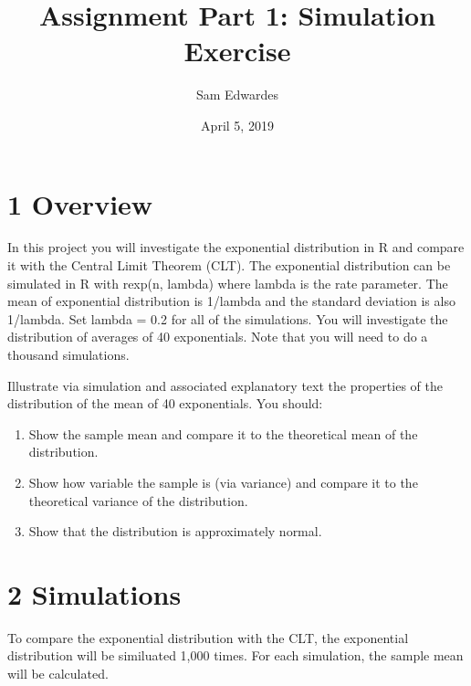 \documentclass[]{article}
\title{Assignment Part 1: Simulation Exercise}
\author{Sam Edwardes}
\date{April 5, 2019}
\providecommand{\tightlist}{%
  \setlength{\itemsep}{0pt}\setlength{\parskip}{0pt}}
\begin{document}
\maketitle

\hypertarget{overview}{%
\section{1 Overview}\label{overview}}

In this project you will investigate the exponential distribution in R
and compare it with the Central Limit Theorem (CLT). The exponential
distribution can be simulated in R with rexp(n, lambda) where lambda is
the rate parameter. The mean of exponential distribution is 1/lambda and
the standard deviation is also 1/lambda. Set lambda = 0.2 for all of the
simulations. You will investigate the distribution of averages of 40
exponentials. Note that you will need to do a thousand simulations.

Illustrate via simulation and associated explanatory text the properties
of the distribution of the mean of 40 exponentials. You should:

\begin{enumerate}
\def\labelenumi{\arabic{enumi}.}
\tightlist
\item
  Show the sample mean and compare it to the theoretical mean of the
  distribution.
\item
  Show how variable the sample is (via variance) and compare it to the
  theoretical variance of the distribution.
\item
  Show that the distribution is approximately normal.
\end{enumerate}

\hypertarget{simulations}{%
\section{2 Simulations}\label{simulations}}

To compare the exponential distribution with the CLT, the exponential
distribution will be similuated 1,000 times. For each simulation, the
sample mean will be calculated.
\end{document}
